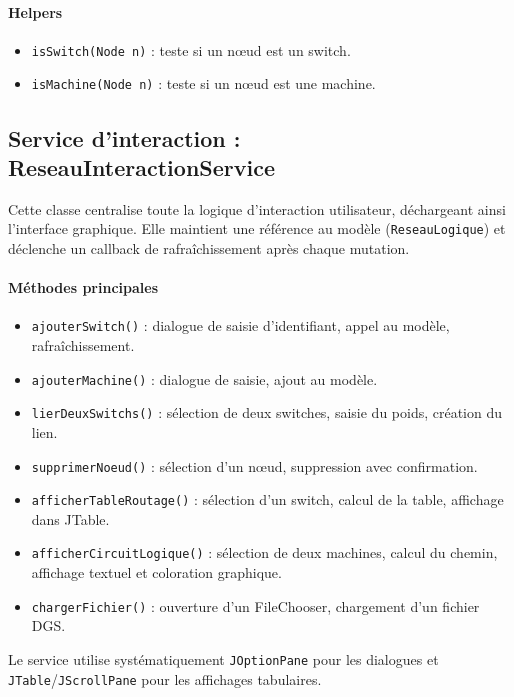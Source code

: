 \documentclass[12pt, a4paper]{article}
\begin{document}
\paragraph{Helpers}
\begin{itemize}
    \item \texttt{isSwitch(Node n)} : teste si un nœud est un switch.
    \item \texttt{isMachine(Node n)} : teste si un nœud est une machine.
\end{itemize}

\subsection{Service d'interaction : ReseauInteractionService}

Cette classe centralise toute la logique d'interaction utilisateur, déchargeant ainsi l'interface graphique. Elle maintient une référence au modèle (\texttt{ReseauLogique}) et déclenche un callback de rafraîchissement après chaque mutation.

\paragraph{Méthodes principales}
\begin{itemize}
    \item \texttt{ajouterSwitch()} : dialogue de saisie d'identifiant, appel au modèle, rafraîchissement.
    \item \texttt{ajouterMachine()} : dialogue de saisie, ajout au modèle.
    \item \texttt{lierDeuxSwitchs()} : sélection de deux switches, saisie du poids, création du lien.
    \item \texttt{supprimerNoeud()} : sélection d'un nœud, suppression avec confirmation.
    \item \texttt{afficherTableRoutage()} : sélection d'un switch, calcul de la table, affichage dans JTable.
    \item \texttt{afficherCircuitLogique()} : sélection de deux machines, calcul du chemin, affichage textuel et coloration graphique.
    \item \texttt{chargerFichier()} : ouverture d'un FileChooser, chargement d'un fichier DGS.
\end{itemize}

Le service utilise systématiquement \texttt{JOptionPane} pour les dialogues et \texttt{JTable}/\texttt{JScrollPane} pour les affichages tabulaires.
\end{document}
